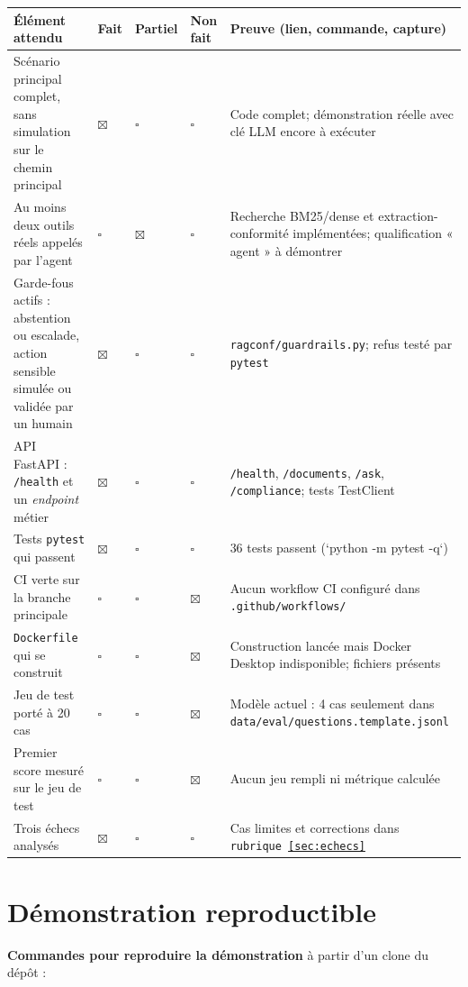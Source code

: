 \documentclass[11pt,a4paper]{article}
\newcommand{\case}{$\square$}
\newcommand{\coche}{$\boxtimes$}
\begin{document}
\begin{tabularx}{\linewidth}{@{}LP{0.9cm}P{1.4cm}P{1.3cm}P{4.2cm}@{}}
\toprule
\textbf{Élément attendu} & \textbf{Fait} & \textbf{Partiel} & \textbf{Non fait} & \textbf{Preuve (lien, commande, capture)} \\
\midrule
Scénario principal complet, sans simulation sur le chemin principal & \coche & \case & \case & Code complet; démonstration réelle avec clé LLM encore à exécuter \\
Au moins deux outils réels appelés par l'agent & \case & \coche & \case & Recherche BM25/dense et extraction-conformité implémentées; qualification « agent » à démontrer \\
Garde-fous actifs : abstention ou escalade, action sensible simulée ou validée par un humain & \coche & \case & \case & \texttt{ragconf/guardrails.py}; refus testé par \texttt{pytest} \\
API FastAPI : \texttt{/health} et un \emph{endpoint} métier & \coche & \case & \case & \texttt{/health}, \texttt{/documents}, \texttt{/ask}, \texttt{/compliance}; tests TestClient \\
Tests \texttt{pytest} qui passent & \coche & \case & \case & 36 tests passent (`python -m pytest -q`) \\
CI verte sur la branche principale & \case & \case & \coche & Aucun workflow CI configuré dans \texttt{.github/workflows/} \\
\texttt{Dockerfile} qui se construit & \case & \case & \coche & Construction lancée mais Docker Desktop indisponible; fichiers présents \\
Jeu de test porté à 20 cas & \case & \case & \coche & Modèle actuel : 4 cas seulement dans \texttt{data/eval/questions.template.jsonl} \\
Premier score mesuré sur le jeu de test & \case & \case & \coche & Aucun jeu rempli ni métrique calculée \\
Trois échecs analysés & \coche & \case & \case & Cas limites et corrections dans \texttt{rubrique~\ref{sec:echecs}} \\
\bottomrule
\end{tabularx}

\section{Démonstration reproductible}

\textbf{Commandes pour reproduire la démonstration} à partir d'un clone du dépôt :
\end{document}
